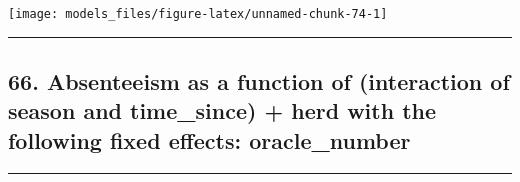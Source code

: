 \documentclass[]{article}
\begin{document}
\begin{center}\texttt{[image: models\_files/figure-latex/unnamed-chunk-74-1]} \end{center}

\newpage

\begin{center}\rule{0.5\linewidth}{\linethickness}\end{center}

\subsection{66. Absenteeism as a function of (interaction of season and
time\_since) + herd with the following fixed effects:
oracle\_number}\label{absenteeism-as-a-function-of-interaction-of-season-and-time_since-herd-with-the-following-fixed-effects-oracle_number-1}

\begin{center}\rule{0.5\linewidth}{\linethickness}\end{center}
\end{document}
